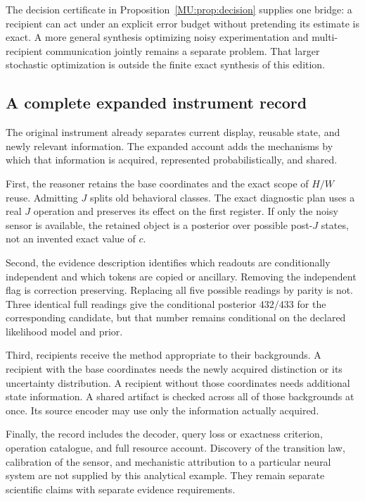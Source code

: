 The decision certificate in Proposition~\ref{MU:prop:decision} supplies one bridge: a recipient can act under an explicit error budget without pretending its estimate is exact. A more general synthesis optimizing noisy experimentation and multi-recipient communication jointly remains a separate problem. That larger stochastic optimization is outside the finite exact synthesis of this edition.

\subsection{A complete expanded instrument record}
The original instrument already separates current display, reusable state, and newly relevant information. The expanded account adds the mechanisms by which that information is acquired, represented probabilistically, and shared.

First, the reasoner retains the base coordinates and the exact scope of $H/W$ reuse. Admitting $J$ splits old behavioral classes. The exact diagnostic plan uses a real $J$ operation and preserves its effect on the first register. If only the noisy sensor is available, the retained object is a posterior over possible post-$J$ states, not an invented exact value of $c$.

Second, the evidence description identifies which readouts are conditionally independent and which tokens are copied or ancillary. Removing the independent flag is correction preserving. Replacing all five possible readings by parity is not. Three identical full readings give the conditional posterior $432/433$ for the corresponding candidate, but that number remains conditional on the declared likelihood model and prior.

Third, recipients receive the method appropriate to their backgrounds. A recipient with the base coordinates needs the newly acquired distinction or its uncertainty distribution. A recipient without those coordinates needs additional state information. A shared artifact is checked across all of those backgrounds at once. Its source encoder may use only the information actually acquired.

Finally, the record includes the decoder, query loss or exactness criterion, operation catalogue, and full resource account. Discovery of the transition law, calibration of the sensor, and mechanistic attribution to a particular neural system are not supplied by this analytical example. They remain separate scientific claims with separate evidence requirements.

